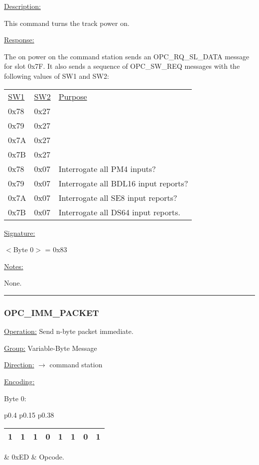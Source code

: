 \underline{Description:}

This command turns the track power on.

\underline{Response:} 

The on power on the command station sends an OPC\_RQ\_SL\_DATA message for slot 0x7F. It also sends a sequence of OPC\_SW\_REQ messages with the following values of SW1 and SW2:

\begin{tabular}{l l l}
\underline{SW1} & \underline{SW2} & \underline{Purpose}\\
0x78 & 0x27\\
0x79 & 0x27\\
0x7A & 0x27\\
0x7B & 0x27\\
0x78 & 0x07 & Interrogate all PM4 inputs?\\
0x79 & 0x07 & Interrogate all BDL16 input reports?\\
0x7A & 0x07 & Interrogate all SE8 input reports?\\
0x7B & 0x07 & Interrogate all DS64 input reports.\\
\end{tabular}

\underline{Signature:}

$<$Byte 0$>$ = 0x83

\underline{Notes:} 

None.

\rule{15.1cm}{0.4pt}
\subsubsection{OPC\_IMM\_PACKET}
\underline{Operation:} Send n-byte packet immediate.

\underline{Group:} \hspace{0.5cm} Variable-Byte Message

\underline{Direction:} \hspace{0.05cm} $\rightarrow$ command station  

\underline{Encoding:} 

Byte 0:

\begin{tabular}{p{0.4\linewidth} p{0.15\linewidth} p{0.38\linewidth}} 

\begin{tabular}{|p{0.3cm}|p{0.3cm}|p{0.3cm}|p{0.3cm}|p{0.3cm}|p{0.3cm}|p{0.3cm}|p{0.3cm}|}
\hline
1 & 1 & 1 & 0 & 1 & 1 & 0 & 1\\
\hline
\end{tabular}
& 0xED & Opcode.\\
\end{tabular}

